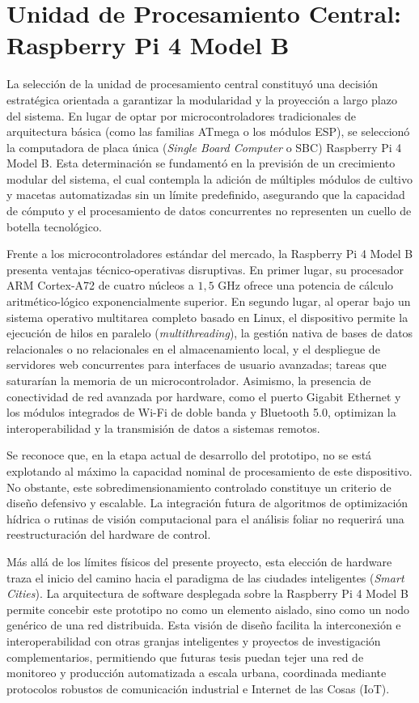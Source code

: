 \section{Unidad de Procesamiento Central: Raspberry Pi 4 Model B}
\label{sec:raspberry_pi}

La selección de la unidad de procesamiento central constituyó una decisión estratégica orientada a garantizar la modularidad y la proyección a largo plazo del sistema. En lugar de optar por microcontroladores tradicionales de arquitectura básica (como las familias ATmega o los módulos ESP), se seleccionó la computadora de placa única (\textit{Single Board Computer} o SBC) Raspberry Pi 4 Model B. Esta determinación se fundamentó en la previsión de un crecimiento modular del sistema, el cual contempla la adición de múltiples módulos de cultivo y macetas automatizadas sin un límite predefinido, asegurando que la capacidad de cómputo y el procesamiento de datos concurrentes no representen un cuello de botella tecnológico.

Frente a los microcontroladores estándar del mercado, la Raspberry Pi 4 Model B presenta ventajas técnico-operativas disruptivas. En primer lugar, su procesador ARM Cortex-A72 de cuatro núcleos a $1{,}5\text{ GHz}$ ofrece una potencia de cálculo aritmético-lógico exponencialmente superior. En segundo lugar, al operar bajo un sistema operativo multitarea completo basado en Linux, el dispositivo permite la ejecución de hilos en paralelo (\textit{multithreading}), la gestión nativa de bases de datos relacionales o no relacionales en el almacenamiento local, y el despliegue de servidores web concurrentes para interfaces de usuario avanzadas; tareas que saturarían la memoria de un microcontrolador. Asimismo, la presencia de conectividad de red avanzada por hardware, como el puerto Gigabit Ethernet y los módulos integrados de Wi-Fi de doble banda y Bluetooth 5.0, optimizan la interoperabilidad y la transmisión de datos a sistemas remotos.

Se reconoce que, en la etapa actual de desarrollo del prototipo, no se está explotando al máximo la capacidad nominal de procesamiento de este dispositivo. No obstante, este sobredimensionamiento controlado constituye un criterio de diseño defensivo y escalable. La integración futura de algoritmos de optimización hídrica o rutinas de visión computacional para el análisis foliar no requerirá una reestructuración del hardware de control.

Más allá de los límites físicos del presente proyecto, esta elección de hardware traza el inicio del camino hacia el paradigma de las ciudades inteligentes (\textit{Smart Cities}). La arquitectura de software desplegada sobre la Raspberry Pi 4 Model B permite concebir este prototipo no como un elemento aislado, sino como un nodo genérico de una red distribuida. Esta visión de diseño facilita la interconexión e interoperabilidad con otras granjas inteligentes y proyectos de investigación complementarios, permitiendo que futuras tesis puedan tejer una red de monitoreo y producción automatizada a escala urbana, coordinada mediante protocolos robustos de comunicación industrial e Internet de las Cosas (IoT).

